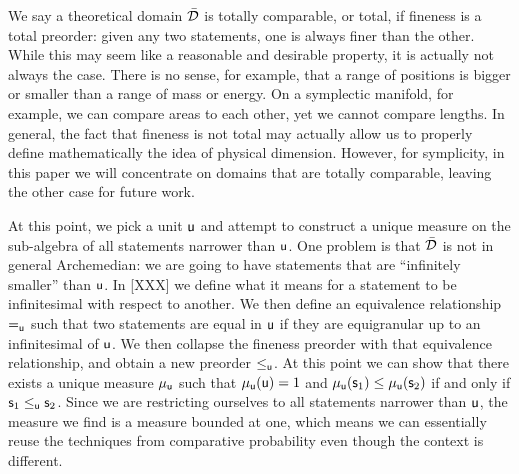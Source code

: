 \documentclass{article}
\begin{document}
We say a theoretical domain $\tdomain$ is totally comparable, or total, if fineness is a total preorder: given any two statements, one is always finer than the other. While this may seem like a reasonable and desirable property, it is actually not always the case. There is no sense, for example, that a range of positions is bigger or smaller than a range of mass or energy. On a symplectic manifold, for example, we can compare areas to each other, yet we cannot compare lengths. In general, the fact that fineness is not total may actually allow us to properly define mathematically the idea of physical dimension. However, for symplicity, in this paper we will concentrate on domains that are totally comparable, leaving the other case for future work.

At this point, we pick a unit $\stmt[u]$ and attempt to construct a unique measure on the sub-algebra of all statements narrower than $\stmt[u]$. One problem is that $\tdomain$ is not in general Archemedian: we are going to have statements that are ``infinitely smaller'' than $\stmt[u]$. In [XXX] we define what it means for a statement to be infinitesimal with respect to another. We then define an equivalence relationship $\equ$ such that two statements are equal in $\stmt[u]$ if they are equigranular up to an infinitesimal of $\stmt[u]$. We then collapse the fineness preorder with that equivalence relationship, and obtain a new preorder $\lequ$. At this point we can show that there exists a unique measure $\mu_{\stmt[u]}$ such that $\mu_{\stmt[u]}(\stmt[u])=1$ and $\mu_{\stmt[u]}(\stmt_1) \leq \mu_{\stmt[u]}(\stmt_2)$ if and only if  $\stmt_1 \lequ \stmt_2$. Since we are restricting ourselves to all statements narrower than $\stmt[u]$, the measure we find is a measure bounded at one, which means we can essentially reuse the techniques from comparative probability even though the context is different.
\end{document}
